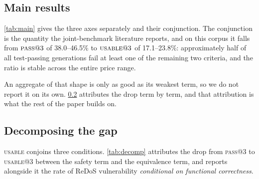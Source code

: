 \documentclass[11pt]{article}
\newcommand{\pass}{\textsc{pass}}
\newcommand{\usable}{\textsc{usable}}
\begin{document}
\subsection{Main results}

\begin{table}[htbp]
\centering
\footnotesize
\setlength{\tabcolsep}{3pt}

\caption{Primary results, $n=k=3$. All figures percentages except $n$ (tasks
entering the @3 estimate) and \emph{undec.} (tasks whose equivalence is
undecidable). Tasks that returned fewer than three samples are excluded from
the estimate rather than scored on what arrived (\cref{sec:metrics}), which is
why $n$ varies; failed requests are itemised in \cref{app:failures}. The
interval is a task-level bootstrap of each model's own score. It is
\emph{not} the paired procedure of \cref{sec:paired} and carries none of its
benefit: pairing is a property of a comparison, not of a score, so a marginal
interval here lands within a twentieth of a point of the binomial one it might
be mistaken for. \textbf{Do not read overlap between these intervals as a
difference that does not resolve.} That inference is the error
\cref{sec:paired} exists to correct, and \resolvedusable{} pairs separate at
95\% under the paired test while every interval in this column overlaps. Ordering is by
\usable{}@3 and should be read as a banding, not a ranking
(\cref{sec:power}).}
\label{tab:main}
\end{table}

\cref{tab:main} gives the three axes separately and their conjunction. The
conjunction is the quantity the joint-benchmark literature reports, and on
this corpus it falls from $\pass{}@3$ of 38.0--46.5\% to $\usable{}@3$ of
17.1--23.8\%: approximately half of all test-passing generations fail at
least one of the remaining two criteria, and the ratio is stable across the
entire price range.

An aggregate of that shape is only as good as its weakest term, so we do not
report it on its own. \cref{sec:decomp} attributes the drop term by term, and
that attribution is what the rest of the paper builds on.

\subsection{Decomposing the gap}
\label{sec:decomp}

\usable{} conjoins three conditions. \cref{tab:decomp} attributes the drop
from \pass{}@3 to \usable{}@3 between the safety term and the equivalence
term, and reports alongside it the rate of ReDoS vulnerability
\emph{conditional on functional correctness}.
\end{document}
